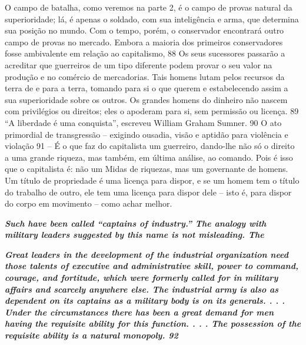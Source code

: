  
\par
 
O campo de batalha, como veremos na parte 2, é o campo de provas natural da superioridade; lá, é apenas o soldado, com sua inteligência e arma, que determina sua posição no mundo. Com o tempo, porém, o conservador encontrará outro campo de provas no mercado. Embora a maioria dos primeiros conservadores fosse ambivalente em relação ao capitalismo,
 {\color{blue} 88}  
Os seus sucessores passarão a acreditar que guerreiros de um tipo diferente podem provar o seu valor na produção e no comércio de mercadorias. Tais homens lutam pelos recursos da terra de e para a terra, tomando para si o que querem e estabelecendo assim a sua superioridade sobre os outros. Os grandes homens do dinheiro não nascem com privilégios ou direitos; eles o apoderam para si, sem permissão ou licença.
 {\color{blue} 89}  
“A liberdade é uma conquista”, escreveu William Graham Sumner.
 {\color{blue} 90}  
O ato primordial de transgressão – exigindo ousadia, visão e aptidão para violência e violação
 {\color{blue} 91}  
– É o que faz do capitalista um guerreiro, dando-lhe não só o direito a uma grande riqueza, mas também, em última análise, ao comando. Pois é isso que o capitalista é: não um Midas de riquezas, mas um governante de homens. Um título de propriedade é uma licença para dispor, e se um homem tem o título do trabalho de outro, ele tem uma licença para dispor dele – isto é, para dispor do corpo em movimento – como achar melhor.
 
\par
 

 \textbf{\textit{Such have been called “captains of industry.” The analogy with military leaders suggested by this name is not misleading. The} }  
 
 
\par
 

 
\par
 

 \textbf{\textit{Great leaders in the development of the industrial organization need those talents of executive and administrative skill, power to command, courage, and fortitude, which were formerly called for in military affairs and scarcely anywhere else. The industrial army is also as dependent on its captains as a military body is on its generals. . . . Under the circumstances there has been a great demand for men having the requisite ability for this function. . . . The possession of the requisite ability is a natural monopoly. {{\color{blue} 92} } } }  
 

